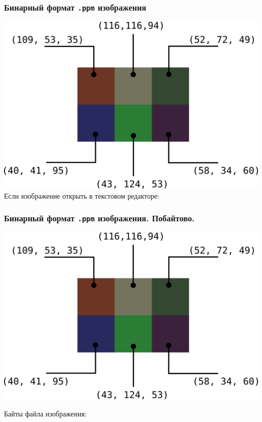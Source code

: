 \documentclass[10pt,pdf,hyperref={unicode}]{beamer}
\begin{document}
\begin{frame}[fragile]
\frametitle{Бинарный формат \texttt{.ppm} изображения} 
\begin{multicols}{2}
\includegraphics[scale=0.45]{./images/tiny_new_wn.png}
\vfill
Если изображение открыть в текстовом редакторе:
\noindent{}
\end{multicols}
\end{frame}


\begin{frame}[fragile]
\frametitle{Бинарный формат \texttt{.ppm} изображения. Побайтово.} 
\begin{multicols}{2}
\includegraphics[scale=0.45]{./images/tiny_new_wn.png}

\vfill
Байты файла изображения:
\noindent{}
\end{multicols}
\end{frame}
\end{document}
